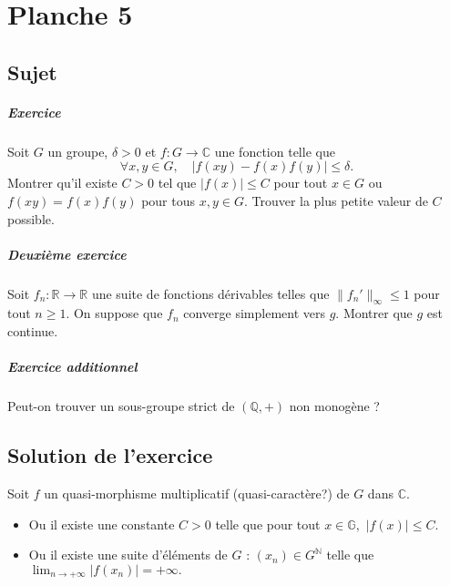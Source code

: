 \chapter{Planche 5}

\section{Sujet}

\paragraph{Exercice}
Soit $G$ un groupe, $\delta > 0$ et $f : G \to \mathbb C$ une fonction telle que
\[
\forall x,y \in G,\quad |f(xy)-f(x)f(y)| \leqslant \delta.
\]
Montrer qu'il existe $C > 0$ tel que $|f(x)| \leqslant C$ pour tout $x \in G$ ou $f(xy) = f(x)f(y)$ pour tous $x,y \in G$.
Trouver la plus petite valeur de $C$ possible.

\paragraph{Deuxième exercice}

Soit $f_n : \mathbb R \to \mathbb R$ une suite de fonctions dérivables telles que $\|f_n'\|_\infty \leqslant 1$ pour tout $n\geqslant 1$. On suppose que $f_n$ converge simplement vers $g$. Montrer que $g$ est continue.

\paragraph{Exercice additionnel}
Peut-on trouver un sous-groupe strict de $(\mathbb Q,+)$ non monogène ?

\section{Solution de l'exercice} %

Soit $f$ un quasi-morphisme multiplicatif (quasi-caractère?) de $G$ dans $\mathbb{C}.$\\

\begin{itemize}
\item Ou il existe une constante $C>0$ telle que pour tout $x\in \mathbb{G},$ $\displaystyle \vert f(x) \vert \leq C.$
\item Ou il existe une suite d'éléments de $G$ : $\displaystyle (x_{n})\in G^{\mathbb{N}}$ telle que $\displaystyle \lim_{n\rightarrow +\infty} \vert f(x_{n})\vert =+\infty.$
\end{itemize}

